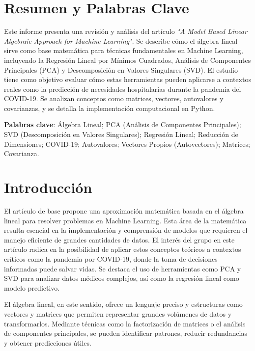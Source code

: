 \documentclass[12pt]{article}
\begin{document}
	\section{Resumen y Palabras Clave}
	\noindent
	Este informe presenta una revisión y análisis del artículo \emph{"A Model Based Linear Algebraic Approach for Machine Learning"}. Se describe cómo el álgebra lineal sirve como base matemática para técnicas fundamentales en Machine Learning, incluyendo la Regresión Lineal por Mínimos Cuadrados, Análisis de Componentes Principales (PCA) y Descomposición en Valores Singulares (SVD). El estudio tiene como objetivo evaluar cómo estas herramientas pueden aplicarse a contextos reales como la predicción de necesidades hospitalarias durante la pandemia del COVID-19. Se analizan conceptos como matrices, vectores, autovalores y covarianzas, y se detalla la implementación computacional en Python.

	\vspace{1em}
	\noindent
	\textbf{Palabras clave}: Álgebra Lineal; PCA (Análisis de Componentes Principales); SVD (Descomposición en Valores Singulares); Regresión Lineal; Reducción de Dimensiones; COVID-19; Autovalores; Vectores Propios (Autovectores); Matrices; Covarianza.
	\newpage
	\section{Introducción}
	\noindent
	El artículo de base propone una aproximación matemática basada en el álgebra lineal para resolver problemas en Machine Learning. Esta área de la matemática resulta esencial en la implementación y comprensión de modelos que requieren el manejo eficiente de grandes cantidades de datos. El interés del grupo en este artículo radica en la posibilidad de aplicar estos conceptos teóricos a contextos críticos como la pandemia por COVID-19, donde la toma de decisiones informadas puede salvar vidas. Se destaca el uso de herramientas como PCA y SVD para analizar datos médicos complejos, así como la regresión lineal como modelo predictivo.
	
	\vspace{1em}
	\noindent
	El álgebra lineal, en este sentido, ofrece un lenguaje preciso y estructuras como vectores y matrices que permiten representar grandes volúmenes de datos y transformarlos. Mediante técnicas como la factorización de matrices o el análisis de componentes principales, se pueden identificar patrones, reducir redundancias y obtener predicciones útiles.
	
\end{document}
